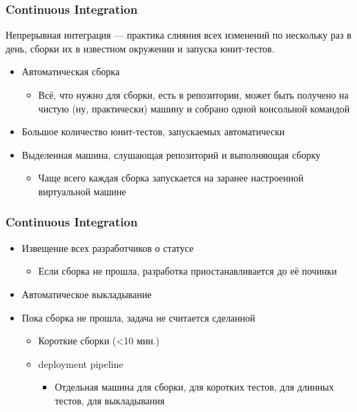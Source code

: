 \documentclass{../../slides-style}
\begin{document}
    \begin{frame}
        \frametitle{Continuous Integration}
        Непрерывная интеграция --- практика слияния всех изменений по нескольку раз в день, сборки их в известном окружении и запуска юнит-тестов.
        \begin{itemize}
            \item Автоматическая сборка
            \begin{itemize}
                \item Всё, что нужно для сборки, есть в репозитории, может быть получено на чистую (ну, практически) машину и собрано одной консольной командой
            \end{itemize}
            \item Большое количество юнит-тестов, запускаемых автоматически
            \item Выделенная машина, слушающая репозиторий и выполняющая сборку
            \begin{itemize}
                \item Чаще всего каждая сборка запускается на заранее настроенной виртуальной машине
            \end{itemize}
        \end{itemize}
    \end{frame}

    \begin{frame}
        \frametitle{Continuous Integration}
        \begin{itemize}
            \item Извещение всех разработчиков о статусе
            \begin{itemize}
                \item Если сборка не прошла, разработка приостанавливается до её починки
            \end{itemize}
            \item Автоматическое выкладывание
            \item Пока сборка не прошла, задача не считается сделанной
            \begin{itemize}
                \item Короткие сборки (<10 мин.)
                \item deployment pipeline
                \begin{itemize}
                    \item Отдельная машина для сборки, для коротких тестов, для длинных тестов, для выкладывания
                \end{itemize}
            \end{itemize}
        \end{itemize}
    \end{frame}
\end{document}
